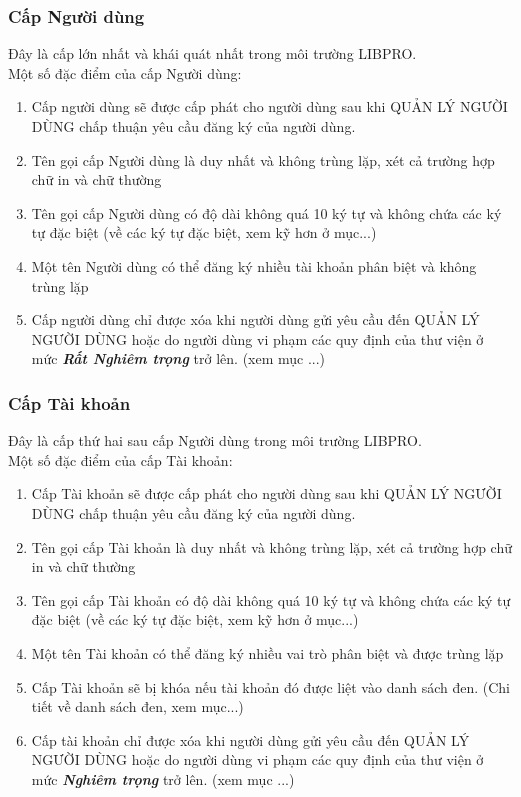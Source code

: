 \documentclass[12pt,a4paper]{report}
\begin{document}
			\subsubsection{Cấp Người dùng}
			Đây là cấp lớn nhất và khái quát nhất trong môi trường LIBPRO.\\
			Một số đặc điểm của cấp Người dùng:
			\begin{enumerate}
				\item Cấp người dùng sẽ được cấp phát cho người dùng sau khi QUẢN LÝ NGƯỜI DÙNG chấp thuận yêu cầu đăng ký của người dùng.
				\item Tên gọi cấp Người dùng là duy nhất và không trùng lặp, xét cả trường hợp chữ in và chữ thường
				\item Tên gọi cấp Người dùng có độ dài không quá 10 ký tự và không chứa các ký tự đặc biệt (về các ký tự đặc biệt, xem kỹ hơn ở mục...)
				\item Một tên Người dùng có thể đăng ký nhiều tài khoản phân biệt và không trùng lặp
				\item Cấp người dùng chỉ được xóa khi người dùng gửi yêu cầu đến QUẢN LÝ NGƯỜI DÙNG hoặc do người dùng vi phạm các quy định của thư viện ở mức \textbf{\textit{Rất Nghiêm trọng}} trở lên. (xem mục ...)
			\end{enumerate}

			\subsubsection{Cấp Tài khoản}
			Đây là cấp thứ hai sau cấp Người dùng trong môi trường LIBPRO.\\
			Một số đặc điểm của cấp Tài khoản:
			\begin{enumerate}
				\item Cấp Tài khoản sẽ được cấp phát cho người dùng sau khi QUẢN LÝ NGƯỜI DÙNG chấp thuận yêu cầu đăng ký của người dùng.
				\item Tên gọi cấp Tài khoản là duy nhất và không trùng lặp, xét cả trường hợp chữ in và chữ thường
				\item Tên gọi cấp Tài khoản có độ dài không quá 10 ký tự và không chứa các ký tự đặc biệt (về các ký tự đặc biệt, xem kỹ hơn ở mục...)
				\item Một tên Tài khoản có thể đăng ký nhiều vai trò phân biệt và được trùng lặp
				\item Cấp Tài khoản sẽ bị khóa nếu tài khoản đó được liệt vào danh sách đen. (Chi tiết về danh sách đen, xem mục...)
				\item Cấp tài khoản chỉ được xóa khi người dùng gửi yêu cầu đến QUẢN LÝ NGƯỜI DÙNG hoặc do người dùng vi phạm các quy định của thư viện ở mức \textbf{\textit{Nghiêm trọng}} trở lên. (xem mục ...)
			\end{enumerate}
\end{document}
